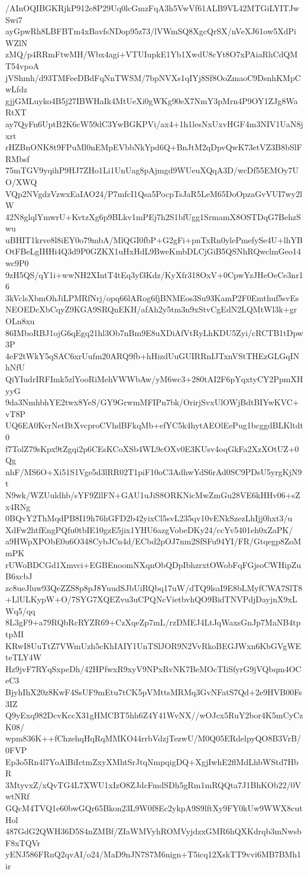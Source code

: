 /AInOQIBGKRjkP912e8P29Uq0lcGmzFqA3h5VwVf61ALB9VL42MTGiLYITJwSwi7
ayGpwRh8LBFBTm4xBavfsNDop95z73/lVWmSQ8XgcQrSX/nVeXJ61ow5XdPiWZlN
zMQ/p4RRmFtwMH/Wbx4agi+VTUIupkE1Yb1XwdU8cYt8O7xPAiaRhCdQMT54vpoA
jVShmh/d93TMFeeDBdFqNnTWSM/7bpNVXs1qIYj8Sf8OoZmaoC9DsnhKMpCwLfdz
gjjGMLuyko4B5j27IBWHaIk4MtUeXi0gWKg90eX7NmY3pMrn4P9OY1ZJg8WaRtXT
ay7QyFn6UptB2K6cW59dC3YwBGKPVi/ax4+1h1lesNxUxvHGF4m3NIV1UaN8jxrt
rHZBnONK8t9FPuMl0nEMpEVbbNkYpd6Q+BnJtM2qDpvQwK73etVZ3B8bSlFRMbsf
75mTGV9yqihP9HJ7ZHo1Li1UnUag8pAjmgd9WUeuXQqA3D/wcDf55EMOy7UO/XWQ
VQp2NVgdzVzwxEaIAO24/P7mfcI1Qsa5PocpTsJaR5LeM65DoOpzaGvVUI7wy2lW
42N8glqlYmwrU+KvtzXg6p9BLkv1mPEj7h2S1bfUgg1SrmamX8OSTDqG7BehzSwu
uBHIT1krve8l8iEY0o79mbA/MlQGI0fbP+G2gFi+pnTxRn0ylePmefySe4U+lhYB
OtFBeLgIHHi4Q3d9P0GZKX1uHxHdL9BweKmbDLCjGiB5QSNhRQwclmGeo14wc9P0
9zH5QS/qY1i+wwNH2XIntT4tEq3yf3Kdz/KyXfr318OxV+0CpwYzJHeOeCe3nr16
3kVclsXbmOhJiLPMRfNrj/opq66lARog6fjBNMEos3Su93KamP2F0Emthuf5svEs
NEOEDcXbCqyZ9KGA9SRQnEKH/afAh2y5tm3n9xStvCgEdN2LQMtWl3k+grOLn8xu
86IMboRBJ1ojG6qEgq21hl3Ob7nBm9E8uXDiAfVtRyLhKDU5Zyi/cRCTB1tDpw3P
4eF2tWkY5qSAC6xrUufm20ARQ9fb+hHizdUuGUIRRnIJTxnVStTHEzGLGqINhNfU
QiYIudrIRFImk5zlYooRiMehVWWbAw/yM6wc3+280tAI2F6pYqxtyCY2PpmXHyyG
9da3NmhbhYE2twx8YeS/GY9GrwmMFIPn7bk/OrirjSvxUlOWjBdtBIYwKVC+vT8P
UQ6EA0KvrNetBtXvcproCVhdBFkqMb+efYC5k4hytAEOlEePug1bcggdBLKltdt0
f7TolZ79sKpx9tZgqi2p6CEsKCoXSb4WL9cOXv0E3KUsv4oqGkFa2XzXOtUZ+0Qg
nhF/MS6O+Xi51S1Vge5d3lRR02T1piF10oC3AdhwYdS6rAd0SC9PDsU5yrgKjN9t
N9wk/WZUuldhb/sYF9ZllFN+GAU1uJiS8ORKNicMwZmGu28VE6kHHv06+sZx4RNg
0BQvY2ThMqdPB8I19h76hGFD2b42yixCl5svL235qv10vENkSzezLhIjj0hxt3/u
XdFw2htfEngPQfu0tbIE10gzE5jix1YHU6azgVobeDKy24/ccYv5401eh0xZaPK/
a9HWpXPObE0u6O348CybJCn4d/ECbd2pOJ7nm2SfSFu94YI/FR/Gtqegp8ZoMmPK
rUWoBDCGd1Xmvci+EGBEnoomNXqnObQDpIbhzrxtOWobFqFGjsoCWHipZuB6xcbJ
zc8ueJluw93QeZZS8p8pJ8YuudSJbUiRQbq17uW/dTQ9lsaI9E8bLMyfCWA7SlT8
+LlULKypW+O/7SYG7XQEZvu3uCPQNcVietbvhQO9BidTNVPdjDayjnX9xLWq5/qq
8L3gF9+a79RQbRcRYZR69+CzXqeZp7mL/rzDMEJ4LtJqWaxsGnJp7MaNB4tptpMI
KRwI8UuTtZ7VWmUzh5cKhIAIY1UnTSlJOR9N2VvRkoBEGJWxn6KbGVgWEteTLY4W
Hz9jvF7RYqSxpeDh/42HPfwxR9xyV9NPxRvNK7BeMOcTIiSfyrG9jVQbqm4OCeC3
BjyhIhX20z8KwF4SsUF9mEtu7tCK5pVMttsMRMq3GvNFatS7Qd+2e9HVB00Fs3IZ
Q9yExq982DcvKccX31gHMCBT5hh6Z4Y41WvNX//wOJcx5RuY2bor4K5mCyCzK08/
wpm836K++fChzehqHqRqMMKO44rrbVdzjTezwU/M0Q05ERdelpyQO8B3VrB/0FVP
Ep3o5Rn4l7YoAlBiIctmZxyXMhtSrJtqNmpqigDQ+XgjIwhE2flMdLhbWStd7HbR
3MtyvxZ/xQvTG4L7XWU1xIzO8ZJdcFmdSDh5gRm1mRQQta7J1BhKOb22/0VwtNRf
GQcM4TVQ1e60bwGQr65Bkon23L9W0f8Ec2ykpA9S9lftXy9FY0kUw9WWX8cutHol
487GdG2QWH36D5S4nZMBf/ZIaWMVyhROMVyjdzxGMR6hQXKdrqb3mNwsbF8xTQVr
yENJ586FRnQ2qvAI/o24/MaD9nJN7S7M6nign+T5icq12XskTT9vvi6MB7BMh1ir
